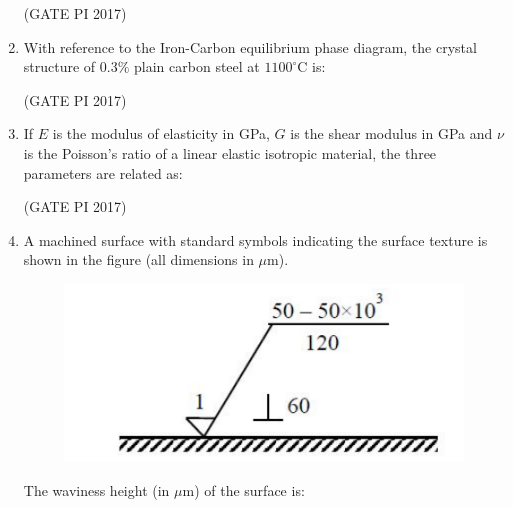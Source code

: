\documentclass[journal,12pt,onecolumn]{IEEEtran}
\theoremstyle{remark}
\begin{document}
\begin{enumerate}
\hfill (GATE PI 2017)

\item With reference to the Iron\--Carbon equilibrium phase diagram, the crystal structure of $0.3\%$ plain carbon steel at $1100^\circ$C is:
\begin{enumerate}
\end{enumerate}

\hfill (GATE PI 2017)

\item If $E$ is the modulus of elasticity in GPa, $G$ is the shear modulus in GPa and $\nu$ is the Poisson's ratio of a linear elastic isotropic material, the three parameters are related as:
\begin{enumerate}
\end{enumerate}

\hfill (GATE PI 2017)

\item A machined surface with standard symbols indicating the surface texture is shown in the figure (all dimensions in $\mu$m).  

\begin{figure}[H]
    \centering
    \includegraphics[width=0.5\columnwidth]{fig3.png}
    \caption{}
    \label{fig:placeholder}
\end{figure}

The waviness height (in $\mu$m) of the surface is:
\begin{enumerate}
\end{enumerate}


\end{enumerate}
\end{document}
